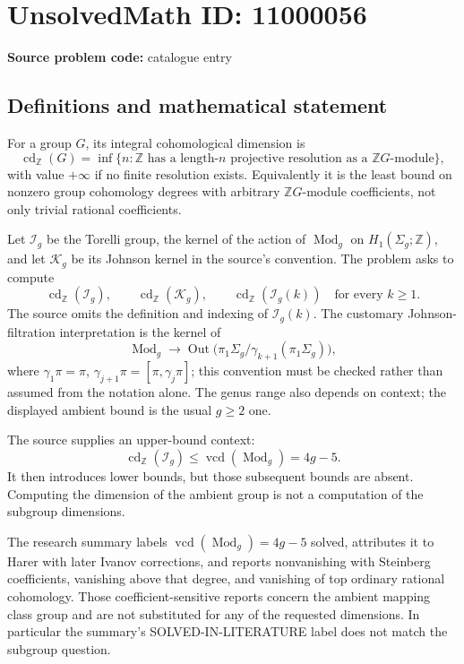 \documentclass[11pt]{article}
\newcommand{\Z}{\mathbb{Z}}
\begin{document}
\section*{UnsolvedMath ID: 11000056}
\textbf{Source problem code:} catalogue entry
\subsection{Definitions and mathematical statement}
For a group \(G\), its integral cohomological dimension is
\[\operatorname{cd}_{\Z}(G)=\inf\{n:\Z\text{ has a length-}n\text{ projective resolution as a }\Z G\text{-module}\},\]
with value \(+\infty\) if no finite resolution exists. Equivalently it is the least bound on nonzero group cohomology degrees with arbitrary \(\Z G\)-module coefficients, not only trivial rational coefficients.

Let \(\mathcal I_g\) be the Torelli group, the kernel of the action of \(\operatorname{Mod}_g\) on \(H_1(\Sigma_g;\Z)\), and let \(\mathcal K_g\) be its Johnson kernel in the source's convention. The problem asks to compute
\[\operatorname{cd}_{\Z}(\mathcal I_g),\qquad
\operatorname{cd}_{\Z}(\mathcal K_g),\qquad
\operatorname{cd}_{\Z}(\mathcal I_g(k))\quad\text{for every }k\geq1.\]
The source omits the definition and indexing of \(\mathcal I_g(k)\). The customary Johnson-filtration interpretation is the kernel of
\[\operatorname{Mod}_g\to\operatorname{Out}\bigl(\pi_1\Sigma_g/\gamma_{k+1}(\pi_1\Sigma_g)\bigr),\]
where \(\gamma_1\pi=\pi\), \(\gamma_{j+1}\pi=[\pi,\gamma_j\pi]\); this convention must be checked rather than assumed from the notation alone. The genus range also depends on context; the displayed ambient bound is the usual \(g\geq2\) one.

The source supplies an upper-bound context:
\[\operatorname{cd}_{\Z}(\mathcal I_g)\leq
\operatorname{vcd}(\operatorname{Mod}_g)=4g-5.\]
It then introduces lower bounds, but those subsequent bounds are absent. Computing the dimension of the ambient group is not a computation of the subgroup dimensions.

The research summary labels \(\operatorname{vcd}(\operatorname{Mod}_g)=4g-5\) solved, attributes it to Harer with later Ivanov corrections, and reports nonvanishing with Steinberg coefficients, vanishing above that degree, and vanishing of top ordinary rational cohomology. Those coefficient-sensitive reports concern the ambient mapping class group and are not substituted for any of the requested dimensions. In particular the summary's SOLVED-IN-LITERATURE label does not match the subgroup question.
\end{document}
